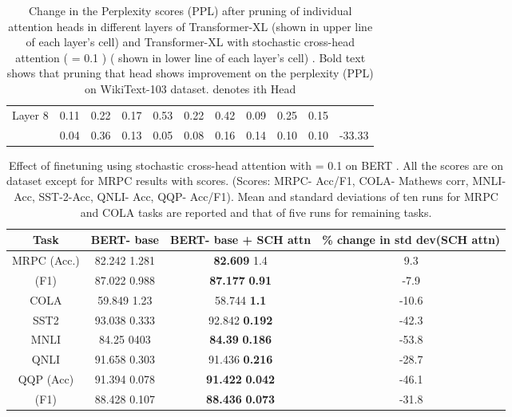 \documentclass[11pt]{article}
\begin{document}
\begin{table*}
\begin{tabular}{c|cccccccccc}
Layer 8 &  0.11 & 0.22 & 0.17 & 0.53 & 0.22 & 0.42 & 0.09 & 0.25 & 0.15 \\
 & 0.04 & 0.36 & 0.13 & 0.05 & 0.08 & 0.16 &  0.14 & 0.10 & 0.10 &-33.33\\

\hline
\end{tabular}
\caption{
Change in the Perplexity scores (PPL) after pruning of individual attention heads in different layers of Transformer-XL (shown in upper line of each layer's cell) and Transformer-XL with stochastic cross-head attention ( = 0.1 ) ( shown in lower line of each layer's cell) . Bold text shows that pruning that head shows improvement on the perplexity (PPL) on WikiText-103 dataset.  denotes ith Head
}
\label{table:prune}
\end{table*}










\begin{table*}
\centering
\begin{tabular}{cccc}
\hline
Task &  \textbf{BERT- base} &  \textbf{BERT- base + SCH attn} & \textbf{\% change in std dev(SCH attn)} \\
\hline
MRPC (Acc.) &  82.242    1.281 &  \textbf{82.609}   1.4  & 9.3\\
\hfill (F1) & 87.022    0.988 &  \textbf{87.177}  \textbf{0.91}  & -7.9   \\
COLA & 59.849  1.23 & 58.744  \textbf{1.1} & -10.6 \\
SST2  &  93.038  0.333  &  92.842   \textbf{0.192} & -42.3\\
MNLI & 84.25  0403 &  \textbf{84.39}  \textbf{0.186} & -53.8\\
QNLI & 91.658  0.303 &  91.436  \textbf{0.216} & -28.7\\
QQP (Acc) &  91.394  0.078 &  \textbf{91.422}  \textbf{0.042} & -46.1 \\
\hfill (F1) & 88.428  0.107 &   \textbf{88.436}  \textbf{0.073} & -31.8\\ 

\hline


\end{tabular}
\caption{
Effect of finetuning using stochastic cross-head attention with = 0.1 on BERT \citep{DBLP:conf/naacl/DevlinCLT19}. All the scores are on  dataset except for MRPC results with  scores. (Scores: MRPC- Acc/F1, COLA- Mathews corr, MNLI- Acc, SST-2-Acc, QNLI- Acc, QQP- Acc/F1). Mean and standard deviations of ten runs for MRPC and COLA tasks are reported and that of five runs for remaining tasks.
}
\label{table:bert}
\end{table*}
\end{document}
